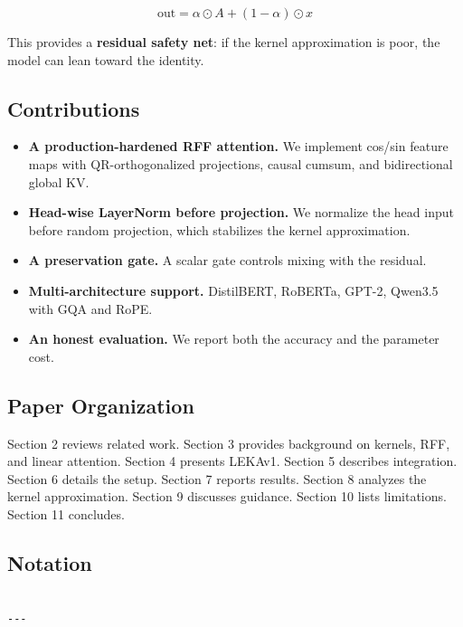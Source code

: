 \[
\text{out} = \alpha \odot A + (1 - \alpha) \odot x
\tag{1.8}
\]

This provides a \textbf{residual safety net}: if the kernel approximation is 
poor, the model can lean toward the identity.

\subsection{Contributions}

\begin{itemize}
\item \textbf{A production-hardened RFF attention.} We implement cos/sin feature
  maps with QR-orthogonalized projections, causal cumsum, and
  bidirectional global KV.
\item \textbf{Head-wise LayerNorm before projection.} We normalize the head input
  before random projection, which stabilizes the kernel approximation.
\item \textbf{A preservation gate.} A scalar gate controls mixing with the residual.
\item \textbf{Multi-architecture support.} DistilBERT, RoBERTa, GPT-2, Qwen3.5
  with GQA and RoPE.
\item \textbf{An honest evaluation.} We report both the accuracy and the parameter
  cost.

\end{itemize}
\subsection{Paper Organization}

Section 2 reviews related work. Section 3 provides background on kernels, 
RFF, and linear attention. Section 4 presents LEKAv1. Section 5 describes 
integration. Section 6 details the setup. Section 7 reports results. 
Section 8 analyzes the kernel approximation. Section 9 discusses guidance. 
Section 10 lists limitations. Section 11 concludes.



\subsection{Notation}

\begin{lstlisting}

---
\end{lstlisting}